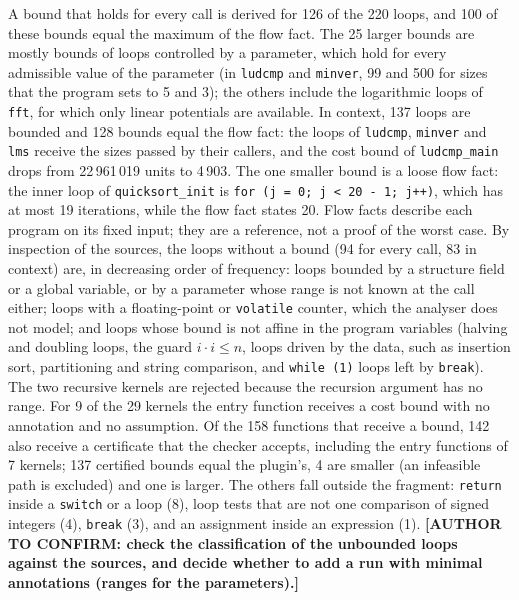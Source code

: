 \documentclass[oneside,english]{amsart}
\numberwithin{equation}{section}
\numberwithin{figure}{section}
\theoremstyle{plain}
\theoremstyle{definition}
\theoremstyle{plain}
\theoremstyle{remark}
\theoremstyle{plain}
\theoremstyle{definition}
\theoremstyle{plain}
\theoremstyle{remark}
\newcommand{\authortodo}[1]{\textbf{[AUTHOR TO CONFIRM: #1]}}
\begin{document}
A bound that holds for every call is derived for 126 of the 220 loops, and 100 of these bounds equal the maximum of the flow fact. The 25 larger bounds are mostly bounds of loops controlled by a parameter, which hold for every admissible value of the parameter (in \texttt{ludcmp} and \texttt{minver}, 99 and 500 for sizes that the program sets to 5 and 3); the others include the logarithmic loops of \texttt{fft}, for which only linear potentials are available. In context, 137 loops are bounded and 128 bounds equal the flow fact: the loops of \texttt{ludcmp}, \texttt{minver} and \texttt{lms} receive the sizes passed by their callers, and the cost bound of \texttt{ludcmp\_main} drops from 22\,961\,019 units to 4\,903. The one smaller bound is a loose flow fact: the inner loop of \texttt{quicksort\_init} is \texttt{for (j = 0; j < 20 - 1; j++)}, which has at most 19 iterations, while the flow fact states 20. Flow facts describe each program on its fixed input; they are a reference, not a proof of the worst case. By inspection of the sources, the loops without a bound (94 for every call, 83 in context) are, in decreasing order of frequency: loops bounded by a structure field or a global variable, or by a parameter whose range is not known at the call either; loops with a floating-point or \texttt{volatile} counter, which the analyser does not model; and loops whose bound is not affine in the program variables (halving and doubling loops, the guard $i \cdot i \le n$, loops driven by the data, such as insertion sort, partitioning and string comparison, and \texttt{while (1)} loops left by \texttt{break}). The two recursive kernels are rejected because the recursion argument has no range. For 9 of the 29 kernels the entry function receives a cost bound with no annotation and no assumption. Of the 158 functions that receive a bound, 142 also receive a certificate that the checker accepts, including the entry functions of 7 kernels; 137 certified bounds equal the plugin's, 4 are smaller (an infeasible path is excluded) and one is larger. The others fall outside the fragment: \texttt{return} inside a \texttt{switch} or a loop (8), loop tests that are not one comparison of signed integers (4), \texttt{break} (3), and an assignment inside an expression (1). \authortodo{check the classification of the unbounded loops against the sources, and decide whether to add a run with minimal annotations (ranges for the parameters).}
\end{document}
